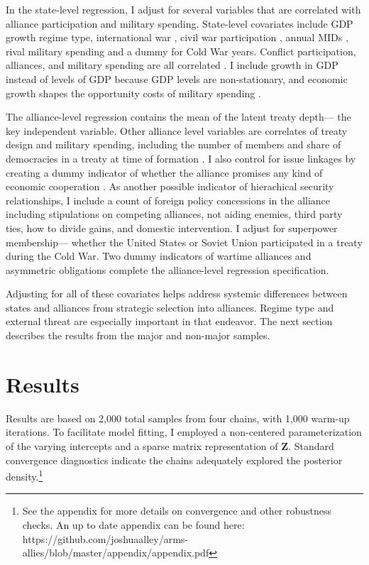\documentclass[12pt]{article}
\begin{document}
In the state-level regression, I adjust for several variables that are correlated with alliance participation and military spending. 
State-level covariates include GDP growth \citep{Boltetal2018} regime type, international war \cite{Reiteretal2016}, civil war participation \citep{SarkeesWayman2010}, annual MIDs \citep{Gibleretal2016}, rival military spending \citep{ThompsonDreyer2012} and a dummy for Cold War years.
Conflict participation, alliances, and military spending are all correlated \citep{SeneseVasquez2008}.
I include growth in GDP instead of levels of GDP because GDP levels are non-stationary, and economic growth shapes the opportunity costs of military spending \citep{Kimball2010, Zielinskietal2017}.  


The alliance-level regression contains the mean of the latent treaty depth--- the key independent variable. 
Other alliance level variables are correlates of treaty design and military spending, including the number of members and share of democracies in a treaty at time of formation \citep{Chibaetal2015}. 
I also control for issue linkages by creating a dummy indicator of whether the alliance promises any kind of economic cooperation \citep{Poast2013, LongLeeds2006}. 
As another possible indicator of hierachical security relationships, I include a count of foreign policy concessions in the alliance including stipulations on competing alliances, not aiding enemies, third party ties, how to divide gains, and domestic intervention. 
I adjust for superpower membership--- whether the United States or Soviet Union participated in a treaty during the Cold War. 
Two dummy indicators of wartime alliances and asymmetric obligations \citep{Leedsetal2002} complete the alliance-level regression specification. 


Adjusting for all of these covariates helps address systemic differences between states and alliances from strategic selection into alliances. 
Regime type and external threat are especially important in that endeavor. 
The next section describes the results from the major and non-major samples.
 

\section{Results}


Results are based on 2,000 total samples from four chains, with 1,000 warm-up iterations. 
To facilitate model fitting, I employed a non-centered parameterization of the varying intercepts and a sparse matrix representation of \textbf{Z}. 
Standard convergence diagnostics indicate the chains adequately explored the posterior density.\footnote{See the appendix for more details on convergence and other robustness checks. An up to date appendix can be found here: https://github.com/joshuaalley/arms-allies/blob/master/appendix/appendix.pdf} 
\end{document}
